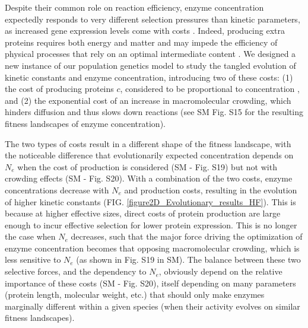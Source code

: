 Despite their common role on reaction efficiency, enzyme concentration expectedly responds to very different selection pressures than kinetic parameters, as increased gene expression levels come with costs \citep{Wagner05,Lang09,ScottM10,Noor16,Kafri16}. Indeed, producing extra proteins requires both energy and matter \citep{Novick57,Stoebel08,Wagner05,Lynch15} and may impede the efficiency of physical processes that rely on an optimal intermediate content \citep{Dong95,Dill11,Andrews20}. We designed a new instance of our population genetics model to study the tangled evolution of kinetic constants and enzyme concentration, introducing two of these costs: (1) the cost of producing proteins $c$, considered to be proportional to concentration \citep{Wagner05,Chou14,Lynch15}, and (2) the exponential cost of an increase in macromolecular crowding, which hinders diffusion and thus slows down reactions \citep{Dill11,Schavemaker18,Andrews20} 
(see SM Fig. S15 for the resulting fitness landscapes of enzyme concentration).

The two types of costs result in a different shape of the fitness landscape, with the noticeable difference that evolutionarily expected concentration depends on $N_e$ when the cost of production is considered (SM - Fig. S19) but not with crowding effects (SM - Fig. S20). With a combination of the two costs, enzyme concentrations decrease with $N_e$ and production costs, resulting in the evolution of higher kinetic constants (FIG. \ref{figure2D_Evolutionary_results_HF}). This is because at higher effective sizes, direct costs of protein production are large enough to incur effective selection for lower protein expression. This is no longer the case when $N_e$ decreases, such that the major force driving the optimization of enzyme concentration becomes that opposing macromolecular crowding, which is less sensitive to $N_e$ (as shown in Fig. S19 in SM). The balance between these two selective forces, and the dependency to $N_e$, obviously depend on the relative importance of these costs (SM - Fig. S20), itself depending on many parameters (protein length, molecular weight, etc.) that should only make enzymes marginally different within a given species (when their activity evolves on similar fitness landscapes).

